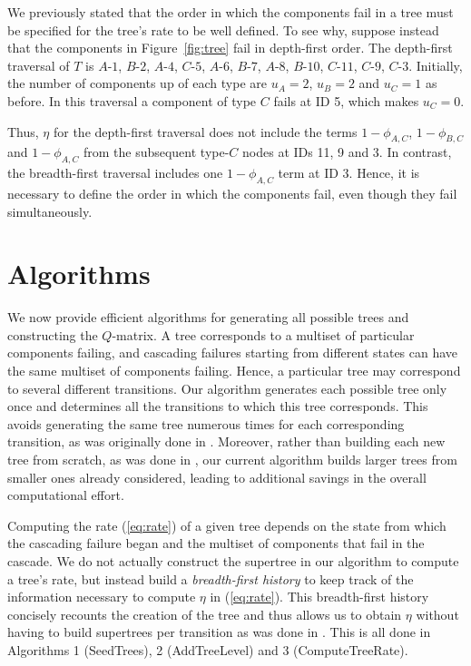 \documentclass[12pt]{article}
\newcommand{\varName}[1]{\textrm{\it#1}}
\newcommand{\nodeLabel}[2]{\mbox{$#1$-$#2$}}
\begin{document}
We previously stated that the order in which the components fail in a tree must
be specified for the tree's rate to  be well defined. To see why, suppose
instead that the components in Figure~\ref{fig:tree} fail in depth-first order.
The depth-first traversal of $T$ is \nodeLabel{A}{1}, \nodeLabel{B}{2},
\nodeLabel{A}{4}, \nodeLabel{C}{5}, \nodeLabel{A}{6}, \nodeLabel{B}{7},
\nodeLabel{A}{8}, \nodeLabel{B}{10}, \nodeLabel{C}{11}, \nodeLabel{C}{9},
\nodeLabel{C}{3}. Initially, the number of components up of each type are $u_A =
2$, $u_B = 2$ and $u_C = 1$ as before. In this traversal a component of type $C$
fails at ID 5, which makes $u_C = 0$.

Thus, $\eta$ for the depth-first traversal does not include the terms
$1-\phi_{A,C}$, $1-\phi_{B,C}$ and $1-\phi_{A,C}$ from the subsequent type-$C$
nodes at IDs 11, 9 and 3. In contrast, the breadth-first traversal includes one
$1-\phi_{A,C}$ term at ID 3. Hence, it is necessary to define the order in which
the components fail, even though they fail simultaneously.

\section{Algorithms}
\label{sec:alg}

We now provide efficient algorithms for generating all possible trees and
constructing the $Q$-matrix. A tree corresponds to a multiset of particular
components failing, and cascading failures starting from different states can
have the same multiset of components failing. Hence, a particular tree may
correspond to several different transitions. Our algorithm generates each
possible tree only once and determines all the transitions to which this tree
corresponds. This avoids generating the same tree numerous times for each
corresponding transition, as was originally done in \cite{ING:2009}. Moreover,
rather than building each new tree from scratch, as was done in \cite{ING:2009},
our current algorithm builds larger trees from smaller ones already considered,
leading to additional savings in the overall computational effort.


Computing the rate (\ref{eq:rate}) of a given tree depends on the state from
which the cascading failure began and the multiset of components that fail in
the cascade. We do not actually construct the supertree in our algorithm to
compute a tree's rate, but instead build a \varName{breadth-first history} to
keep track of the information necessary to compute $\eta$ in (\ref{eq:rate}).
This breadth-first history concisely recounts the creation of the tree
and thus allows us to obtain $\eta$ without having to build supertrees per
transition as was done in \cite{ING:2009}. This is all done in Algorithms 1
(SeedTrees), 2 \mbox{(AddTreeLevel)} and 3 (ComputeTreeRate).
\end{document}
